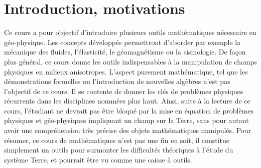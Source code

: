 \section{Introduction, motivations}
Ce cours a pour objectif d'introduire plusieurs outils mathématiques nécessaire en géo-physique. Les concepts développés permettront d'aborder par exemple la mécanique des fluides, l'élasticité, le géomagnétisme ou la sismologie. De façon plus général, ce cours donne les outils indispensables à la manipulation de champs physiques en milieux anisotropes.
L'aspect purement mathématique, tel que les démonstrations formelles ou l'introduction de nouvelles algèbres n'est pas l'objectif de ce cours. Il se contente de donner les clés de problèmes physiques récurrents dans les disciplines nommées plus haut. Ainsi, suite à la lecture de ce cours, l'étudiant ne devrait pas être bloqué par la mise en équation de problèmes physiques et géo-physiques impliquant un champ sur la Terre, sans pour autant avoir une compréhension très précise des objets mathématiques manipulés. 
Pour résumer, ce cours de mathématiques n'est pas une fin en soit, il constitue simplement un outils pour surmonter les difficultés théoriques à l'étude du système Terre, et pourrait être vu comme une caisse à outils.
